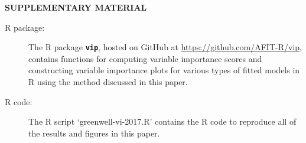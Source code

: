 \documentclass[12pt]{article}
\newcommand{\pkg}[1]{\texorpdfstring%
{{\normalfont\fontseries{b}\selectfont #1}}%
{#1}}
\newcommand{\file}[1]{{`\normalfont\textsf{#1}'}}
\def\pkg#1{\textbf{\texttt{#1}}}
\begin{document}

\bigskip
\begin{center}
{\large\bf SUPPLEMENTARY MATERIAL}
\end{center}

\begin{description}

\item[R package:] The R package \pkg{vip}, hosted on GitHub at \url{https://github.com/AFIT-R/vip}, contains functions for computing variable importance scores and constructing variable importance plots for various types of fitted models in R using the method discussed in this paper.

\item[R code:] The R script \file{greenwell-vi-2017.R} contains the R code to reproduce all of the results and figures in this paper.

\end{description}






\end{document}
